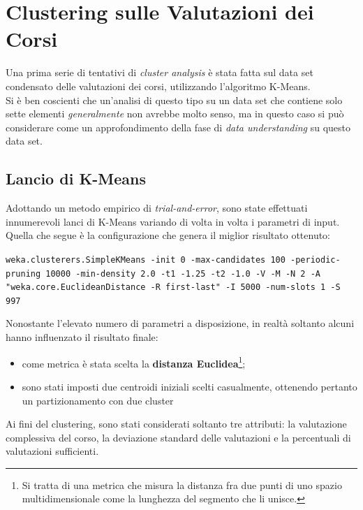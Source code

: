 \section{Clustering sulle Valutazioni dei Corsi}

    Una prima serie di tentativi di \textit{cluster analysis} è stata fatta sul data set condensato delle valutazioni dei corsi, utilizzando l'algoritmo K-Means. \\

    Si è ben coscienti che un'analisi di questo tipo su un data set che contiene solo sette elementi \textit{generalmente} non avrebbe molto senso, ma in questo caso si può considerare come un approfondimento della fase di \textit{data understanding} su questo data set.

    \subsection{Lancio di K-Means}

        Adottando un metodo empirico di \textit{trial-and-error}, sono state effettuati innumerevoli lanci di K-Means variando di volta in volta i parametri di input. \\

        Quella che segue è la configurazione che genera il miglior risultato ottenuto:

        \begin{center}
            \texttt{weka.clusterers.SimpleKMeans -init 0 -max-candidates 100 -periodic-pruning 10000 -min-density 2.0 -t1 -1.25 -t2 -1.0 -V -M -N 2 -A "weka.core.EuclideanDistance -R first-last" -I 5000 -num-slots 1 -S 997}
        \end{center}

        Nonostante l'elevato numero di parametri a disposizione, in realtà soltanto alcuni hanno influenzato il risultato finale:

        \begin{itemize}
            \item come metrica è stata scelta la \textbf{distanza Euclidea}\footnote{Si tratta di una metrica che misura la distanza fra due punti di uno spazio multidimensionale come la lunghezza del segmento che li unisce.};
            \item sono stati imposti due centroidi iniziali scelti casualmente, ottenendo pertanto un partizionamento con due cluster
        \end{itemize}

        Ai fini del clustering, sono stati considerati soltanto tre attributi: la valutazione complessiva del corso, la deviazione standard delle valutazioni e la percentuali di valutazioni sufficienti.


